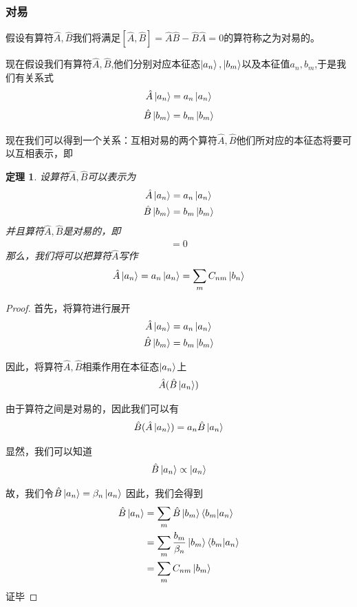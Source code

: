 \documentclass{article}
\newtheorem{theorem}{定理}
\begin{document}
\subsubsection{对易}

假设有算符$\hat{A},\hat{B}$我们将满足$[\hat{A},\hat{B}]=\hat{A}\hat{B}-\hat{B}\hat{A}=0$的算符称之为对易的。

现在假设我们有算符$\hat{A},\hat{B}$,他们分别对应本征态$\ket{a_n},\ket{b_m}$以及本征值$a_n,b_m$,于是我们有关系式
\[\hat{A}\ket{a_n}=a_n\ket{a_n}\]
\[\hat{B}\ket{b_m}=b_m\ket{b_m}\]

现在我们可以得到一个关系：互相对易的两个算符$\hat{A},\hat{B}$他们所对应的本征态将要可以互相表示，即
\begin{theorem}
	设算符$\hat{A},\hat{B}$可以表示为
	\begin{align*}
		\hat{A}\ket{a_n} & =a_n\ket{a_n} \\
		\hat{B}\ket{b_m} & =b_m\ket{b_m}
	\end{align*}
	并且算符$\hat{A},\hat{B}$是对易的，即
	\begin{align*}
		[\hat{A},\hat{B}]=0
	\end{align*}
	那么，我们将可以把算符$\hat{A}$写作
	\begin{align*}
		\hat{A}\ket{a_n}=a_n\ket{a_n}=\sum_{m}C_{nm}\ket{b_n}
	\end{align*}
\end{theorem}



\begin{proof}
	首先，将算符进行展开
	\begin{align*}
		\hat{A}\ket{a_n} & =a_n\ket{a_n} \\
		\hat{B}\ket{b_m} & =b_m\ket{b_m}
	\end{align*}

	因此，将算符$\hat{A},\hat{B}$相乘作用在本征态$\ket{a_n}$上
	\begin{align*}
		\hat{A}(\hat{B}\ket{a_n})
	\end{align*}

	由于算符之间是对易的，因此我们可以有
	\begin{align*}
		\hat{B}(\hat{A}\ket{a_n})=a_n\hat{B}\ket{a_n}
	\end{align*}

	显然，我们可以知道
	\begin{align*}
		\hat{B}\ket{a_n}\propto \ket{a_n}
	\end{align*}

	故，我们令$\displaystyle\hat{B}\ket{a_n}=\beta_n\ket{a_n}$
	因此，我们会得到
	\begin{align*}
		\hat{B}\ket{a_n} & =\sum_{m}\hat{B}\ket{b_m}\braket{b_m}{a_n}             \\
		                 & =\sum_{m}\frac{b_m}{\beta_n}\ket{b_m}\braket{b_m}{a_n} \\
		                 & =\sum_{m}C_{nm}\ket{b_m}
	\end{align*}
	证毕
\end{proof}
\end{document}
